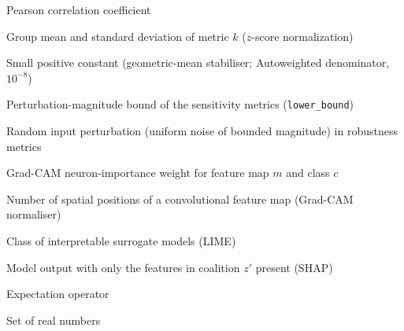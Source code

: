 \begin{description}[leftmargin=3.4cm]
    \item[$r(\cdot,\cdot)$] Pearson correlation coefficient
    \item[$\mu_k, \sigma_k$] Group mean and standard deviation of metric $k$ ($z$-score normalization)
    \item[$\varepsilon$] Small positive constant (geometric-mean stabiliser; Autoweighted denominator, $10^{-8}$)
    \item[$b$] Perturbation-magnitude bound of the sensitivity metrics (\texttt{lower\_bound})
    \item[$\delta_j$] Random input perturbation (uniform noise of bounded magnitude) in robustness metrics
    \item[$\alpha_m^c$] Grad-CAM neuron-importance weight for feature map $m$ and class $c$
    \item[$Z$] Number of spatial positions of a convolutional feature map (Grad-CAM normaliser)
    \item[$G$] Class of interpretable surrogate models (LIME)
    \item[$f_x(z')$] Model output with only the features in coalition $z'$ present (SHAP)
    \item[{$\mathbb{E}[\cdot]$}] Expectation operator
    \item[$\mathbb{R}$] Set of real numbers
\end{description}
